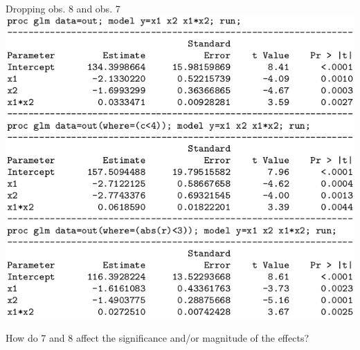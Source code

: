 \documentclass{beamer}
\begin{document}
\begin{frame}{Dropping obs. 8 and obs. 7}
\includegraphics[scale=0.33]{plots/bp-two}
\vspace{10pt}

How do 7 and 8 affect the significance and/or magnitude of the effects?
\end{frame}
\end{document}
